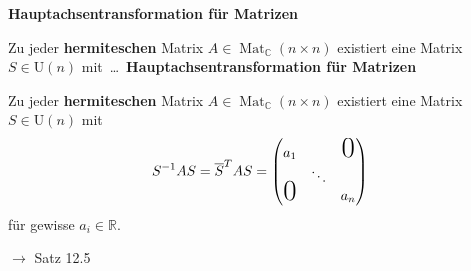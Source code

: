 \documentclass[11pt]{article}
\renewcommand{\cite}[1]{\par\bigskip\hfill{\color{gray}\tiny\(\to\) #1}}
\newcommand{\CC}{\mathbb{C}}
\newcommand{\RR}{\mathbb{R}}
\DeclareMathOperator{\Mat}{Mat}
\let\olddots\dots
\renewcommand{\dots}{\,\olddots\,}
\newenvironment{field}{}{\newpage}
\newif\ifnote
\newenvironment{note}{\notetrue}{\notefalse}
\begin{document}
\begin{note}
    \begin{field}
        \textbf{Hauptachsentransformation für Matrizen}

        Zu jeder \textbf{hermiteschen} Matrix $A\in\Mat_{\CC}(n\times n)$ existiert eine Matrix $S\in\text{U}(n)$ mit \dots
    \end{field}
    \begin{field}
        \textbf{Hauptachsentransformation für Matrizen}

        Zu jeder \textbf{hermiteschen} Matrix $A\in\Mat_{\CC}(n\times n)$ existiert eine Matrix $S\in\text{U}(n)$ mit
        \[S^{-1}AS = \overline{S}^TAS = \begin{pmatrix}
            a_1&&\text{\huge 0}\\
            & \ddots&\\
            \smash{\text{\huge 0}}&& a_n
        \end{pmatrix}\]
        für gewisse $a_i\in\RR$.
        \cite{Satz 12.5}
    \end{field}
\end{note}
\end{document}
